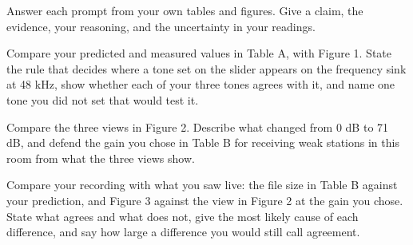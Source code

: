 \documentclass{exam}
\begin{document}
\begin{Form}
\vspace{4pt}

\vspace{8pt}
\noindent{}\hfill
{}\hfill
{}\par
{}\par

\newpage
{}

\vspace{6pt}

Answer each prompt from your own tables and figures. Give a claim, the evidence,
your reasoning, and the uncertainty in your readings.

\begin{questions}

\question Compare your predicted and measured values in Table A, with Figure 1.
State the rule that decides where a tone set on the slider appears on the
frequency sink at 48 kHz, show whether each of your three tones agrees with it, and
name one tone you did not set that would test it.
	\begin{solution}[1.8in]\end{solution}

\question Compare the three views in Figure 2. Describe what changed from 0 dB
to 71 dB, and defend the gain you chose in Table B for receiving weak stations
in this room from what the three views show.
	\begin{solution}[1.6in]\end{solution}

\newpage
\question Compare your recording with what you saw live: the file size in
Table B against your prediction, and Figure 3 against the view in Figure 2 at
the gain you chose. State what agrees and what does not, give the most likely
cause of each difference, and say how large a difference you would still call
agreement.
	\begin{solution}[3.0in]\end{solution}

\end{questions}

\docstatement

\end{Form}
\end{document}
